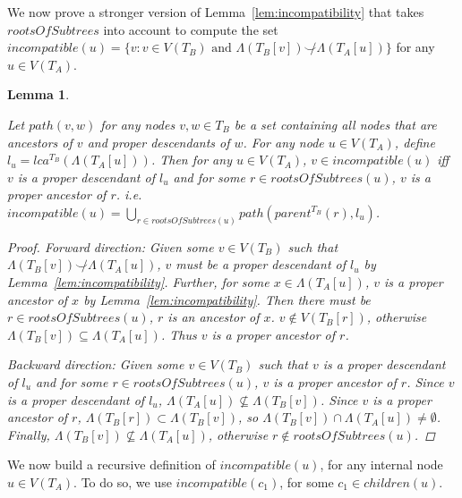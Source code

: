 \documentclass{article}
\newcommand{\compatible}{\smile}
\newcommand{\leafset}{\Lambda}
\newtheorem{incompatibilityrootsofsubtrees}[incompatibility]{Lemma}
\begin{document}
    We now prove a stronger version of Lemma~\ref{lem:incompatibility} that takes $rootsOfSubtrees$ into account to compute the set $incompatible(u) = \{v : v \in V(T_B) \text{ and } \leafset(T_B[v]) \not\compatible \leafset(T_A[u])\}$ for any $u \in V(T_A)$.

    \begin{incompatibilityrootsofsubtrees}
        \label{lem:incompatibilityrootsofsubtrees}

        Let $path(v, w)$ for any nodes $v, w \in T_B$ be a set containing all nodes that are ancestors of $v$ and proper descendants of $w$. For any node $u \in V(T_A)$, define $l_u = lca^{T_B}(\leafset(T_A[u]))$. Then for any $u \in V(T_A)$, $v \in incompatible(u)$ iff $v$ is a proper descendant of $l_u$ and for some $r \in rootsOfSubtrees(u)$, $v$ is a proper ancestor of $r$. i.e. $incompatible(u) = \bigcup_{r \in rootsOfSubtrees(u)} path(parent^{T_B}(r), l_u)$.

        \begin{proof}
            \textit{Forward direction}: Given some $v \in V(T_B)$ such that $\leafset(T_B[v]) \not\compatible \leafset(T_A[u])$, $v$ must be a proper descendant of $l_u$ by Lemma~\ref{lem:incompatibility}. Further, for some $x \in \leafset(T_A[u])$, $v$ is a proper ancestor of $x$ by Lemma~\ref{lem:incompatibility}. Then there must be $r \in rootsOfSubtrees(u)$, $r$ is an ancestor of $x$. $v \not\in V(T_B[r])$, otherwise $\leafset(T_B[v]) \subseteq \leafset(T_A[u])$. Thus $v$ is a proper ancestor of $r$.

            \textit{Backward direction}: Given some $v \in V(T_B)$ such that $v$ is a proper descendant of $l_u$ and for some $r \in rootsOfSubtrees(u)$, $v$ is a proper ancestor of $r$. Since $v$ is a proper descendant of $l_u$, $\leafset(T_A[u]) \not\subseteq \leafset(T_B[v])$. Since $v$ is a proper ancestor of $r$, $\leafset(T_B[r]) \subset \leafset(T_B[v])$, so $\leafset(T_B[v]) \cap \leafset(T_A[u]) \neq \emptyset$. Finally, $\leafset(T_B[v]) \not\subseteq \leafset(T_A[u])$, otherwise $r \not\in rootsOfSubtrees(u)$.
        \end{proof}
    \end{incompatibilityrootsofsubtrees}

    We now build a recursive definition of $incompatible(u)$, for any internal node $u \in V(T_A)$. To do so, we use $incompatible(c_1)$, for some $c_1 \in children(u)$.
    \newline
\end{document}
